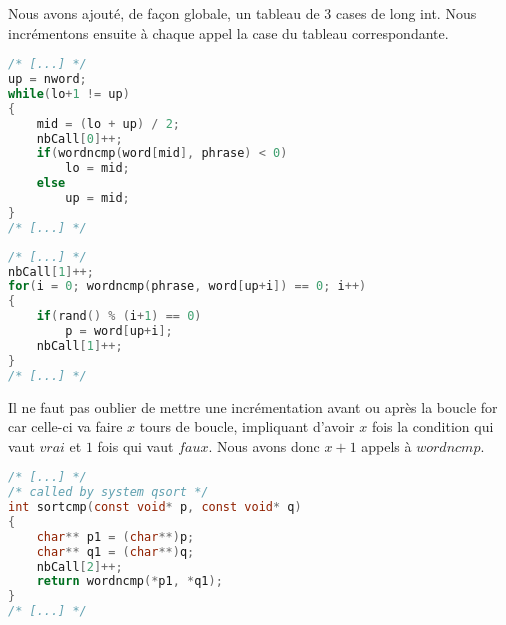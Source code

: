 Nous avons ajouté, de façon globale, un tableau de 3 cases de long int.
Nous incrémentons ensuite à chaque appel la case du tableau correspondante.


\begin{lstlisting}[language=C]
/* [...] */
up = nword;
while(lo+1 != up)
{
	mid = (lo + up) / 2;
	nbCall[0]++;
	if(wordncmp(word[mid], phrase) < 0)
		lo = mid;
	else
		up = mid;
}
/* [...] */
\end{lstlisting}

\begin{lstlisting}[language=C]
/* [...] */
nbCall[1]++;
for(i = 0; wordncmp(phrase, word[up+i]) == 0; i++)
{
	if(rand() % (i+1) == 0)
		p = word[up+i];
	nbCall[1]++;
}
/* [...] */
\end{lstlisting}
Il ne faut pas oublier de mettre une incrémentation avant ou après la boucle for car celle-ci va faire $x$ tours de boucle, impliquant d'avoir $x$ fois la condition qui vaut $vrai$ et $1$ fois qui vaut $faux$. Nous avons donc $x + 1$ appels à $wordncmp$.


\begin{lstlisting}[language=C]
/* [...] */
/* called by system qsort */
int sortcmp(const void* p, const void* q)
{
	char** p1 = (char**)p;
	char** q1 = (char**)q;
	nbCall[2]++;
	return wordncmp(*p1, *q1);
}
/* [...] */
\end{lstlisting}

